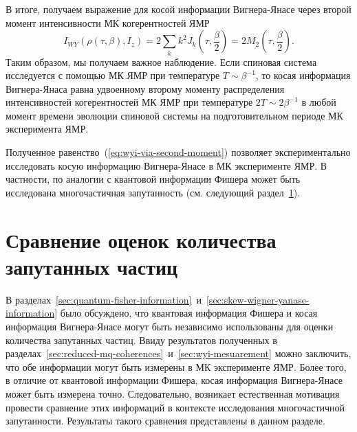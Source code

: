 %
В итоге, получаем выражение для косой информации Вигнера-Янасе
через второй момент интенсивности МК когерентностей ЯМР
%
\begin{equation}\label{eq:wyi-via-second-moment}
    I_{WY}\left(\rho(\tau, \beta), I_z\right)
    = 2\sum_k k^2 J_k\left(\tau, \frac{\beta}{2}\right)
    = 2M_2\left(\tau, \frac{\beta}{2}\right).
\end{equation}
%
Таким образом, мы получаем важное наблюдение.
Если спиновая система исследуется с помощью МК ЯМР при температуре $T\sim\beta^{-1}$,
то косая информация Вигнера-Янаса равна удвоенному второму моменту
распределения интенсивностей когерентностей МК ЯМР при температуре $2T \sim 2\beta^{-1}$
в любой момент времени эволюции спиновой системы на подготовительном периоде МК эксперимента ЯМР.

Полученное равенство~(\ref{eq:wyi-via-second-moment}) позволяет экспериментально исследовать
косую информацию Вигнера-Янасе в МК эксперименте ЯМР.
В частности, по аналогии с квантовой информации Фишера
может быть исследована многочастичная запутанность (см. следующий раздел~\ref{sec:qfi-wyi-entanglement-comparison}).


\section{Сравнение оценок количества запутанных частиц}
\label{sec:qfi-wyi-entanglement-comparison}

В разделах~\ref{sec:quantum-fisher-information}~и~\ref{sec:skew-wigner-yanase-information} было обсуждено,
что квантовая информация Фишера и косая информация Вигнера-Янасе
могут быть независимо использованы для оценки количества запутанных частиц.
Ввиду результатов полученных в разделах~\ref{sec:reduced-mq-coherences}~и~\ref{sec:wyi-mesuarement}
можно заключить,
что обе информации могут быть измерены в МК эксперименте ЯМР.
Более того, в отличие от квантовой информации Фишера,
косая информация Вигнера-Янасе может быть измерена точно.
Следовательно, возникает естественная мотивация провести сравнение
этих информаций в контексте исследования многочастичной запутанности.
Результаты такого сравнения представлены в данном разделе.

